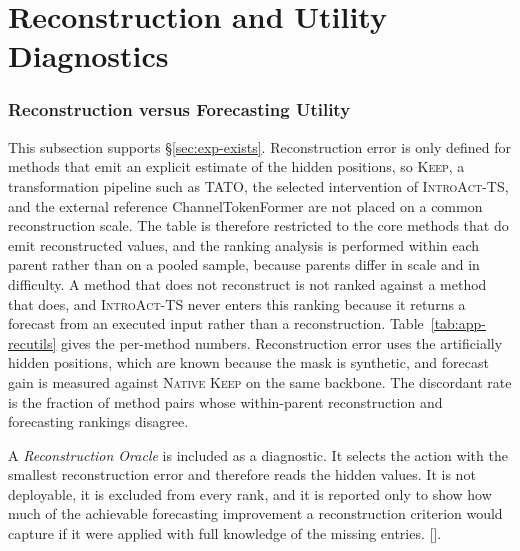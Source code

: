 \documentclass{article}
\newcommand{\ph}[1]{\textcolor{phgray}{\textsf{[\detokenize{#1}]}}}
\newcommand{\introact}{\textsc{IntroAct-TS}}
\begin{document}
\section{Reconstruction and Utility Diagnostics}
\label{app:diagnostics}
\subsubsection{Reconstruction versus Forecasting Utility}
\label{app:recutils}
This subsection supports \S\ref{sec:exp-exists}. Reconstruction error is only defined for
methods that emit an explicit estimate of the hidden positions, so \textsc{Keep}, a
transformation pipeline such as TATO, the selected intervention of \introact{}, and the
external reference ChannelTokenFormer are not placed on a common reconstruction scale. The
table is therefore restricted to the core methods that do emit reconstructed values, and the
ranking analysis is performed within each parent rather than on a pooled sample, because
parents differ in scale and in difficulty. A method that does not reconstruct is not ranked
against a method that does, and \introact{} never enters this ranking because it returns a
forecast from an executed input rather than a reconstruction. Table~\ref{tab:app-recutils}
gives the per-method numbers. Reconstruction error uses the artificially hidden positions,
which are known because the mask is synthetic, and forecast gain is measured against
\textsc{Native Keep} on the same backbone. The discordant rate is the fraction of method pairs
whose within-parent reconstruction and forecasting rankings disagree.

A \emph{Reconstruction Oracle} is included as a diagnostic. It selects the action with the
smallest reconstruction error and therefore reads the hidden values. It is not deployable, it
is excluded from every rank, and it is reported only to show how much of the achievable
forecasting improvement a reconstruction criterion would capture if it were applied with full
knowledge of the missing entries. \ph{RECON_ORACLE_MASE}.
\end{document}
